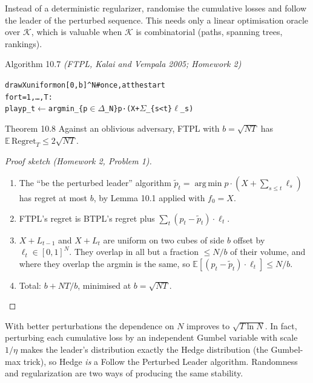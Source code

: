 \documentclass[11pt,a4paper,openany]{book}
\newcommand{\E}{\mathbb{E}}
\newcommand{\Reg}{\mathrm{Regret}}
\DeclareMathOperator*{\argmin}{arg\,min}
\newcommand{\cK}{\mathcal{K}}
\newenvironment{algo}{\par\smallskip\begingroup\footnotesize\begin{alltt}}{\end{alltt}\endgroup\smallskip}
\begin{document}
Instead of a deterministic regularizer, randomise the cumulative losses and follow the leader of the perturbed sequence. This needs only a linear optimisation oracle over $\cK$, which is valuable when $\cK$ is combinatorial (paths, spanning trees, rankings).

\begin{balg}{Algorithm 10.7 \emph{(FTPL, Kalai and Vempala 2005; Homework 2)}}
\begin{algo}
draw X uniform on [0, b]\textasciicircum{}N           \# once, at the start
for t = 1, …, T:
    play p\_t \ensuremath{\leftarrow} argmin\_\{p \ensuremath{\in} \ensuremath{\Delta}\_N\}  p · (X + \ensuremath{\Sigma}\_\{s<t\} \ensuremath{\ell}\_s)
\end{algo}
\end{balg}

\begin{bthm}{Theorem 10.8}
Against an oblivious adversary, FTPL with $b=\sqrt{NT}$ has $\E\,\Reg_T\le2\sqrt{NT}$.
\end{bthm}

\begin{proof}[Proof sketch (Homework 2, Problem 1)]
\begin{enumerate}
\item The ``be the perturbed leader'' algorithm $\tilde p_t=\argmin p\cdot(X+\sum_{s\le t}\ell_s)$ has regret at most $b$, by Lemma 10.1 applied with $f_0=X$.
\item FTPL's regret is BTPL's regret plus $\sum_t(p_t-\tilde p_t)\cdot\ell_t$.
\item $X+L_{t-1}$ and $X+L_t$ are uniform on two cubes of side $b$ offset by $\ell_t\in[0,1]^N$. They overlap in all but a fraction $\le N/b$ of their volume, and where they overlap the argmin is the same, so $\E[(p_t-\tilde p_t)\cdot\ell_t]\le N/b$.
\item Total: $b+NT/b$, minimised at $b=\sqrt{NT}$.
\end{enumerate}
\end{proof}

With better perturbations the dependence on $N$ improves to $\sqrt{T\ln N}$. In fact, perturbing each cumulative loss by an independent Gumbel variable with scale $1/\eta$ makes the leader's distribution exactly the Hedge distribution (the Gumbel-max trick), so Hedge \emph{is} a Follow the Perturbed Leader algorithm. Randomness and regularization are two ways of producing the same stability.
\end{document}
